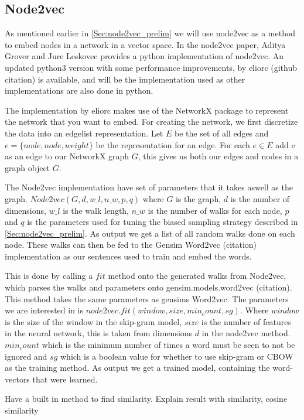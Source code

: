 \subsection{Node2vec}

As mentioned earlier in \ref{Sec:node2vec_prelim} we will use node2vec as a method to embed nodes in a network in a vector space. In the node2vec paper, Aditya Grover and Jure Leskovec provides a python implementation of node2vec. An updated python3 version with some performance improvements, by eliorc (github citation) is available, and will be the implementation used as other implementations are also done in python.

The implementation by eliorc makes use of the NetworkX package to represent the network that you want to embed. For creating the network, we first discretize the data into an edgelist representation. Let $E$ be the set of all edges and $e = \{node, node, weight\}$ be the representation for an edge. For each $e \in E$ add e as an edge to our NetworkX graph $G$, this gives us both our edges and nodes in a graph object $G$.

The Node2vec implementation have set of parameters that it takes aswell as the graph. $Node2vec(G, d, w\_l, n\_w, p, q)$ where $G$ is the graph, $d$ is the number of dimensions, $w\_l$ is the walk length, $n\_w$ is the number of walks for each node, $p$ and $q$ is the parameters used for tuning the biased sampling strategy described in \ref{Sec:node2vec_prelim}. As output we get a list of all random walks done on each node. These walks can then be fed to the Gensim Word2vec (citation) implementation as our sentences used to train and embed the words.

This is done by calling a $fit$ method onto the generated walks from Node2vec, which parses the walks and parameters onto gensim.models.word2vec (citation). This method takes the same parameters as gensims Word2vec. The parameters we are interested in is $node2vec.fit(window, size, min_count, sg)$. Where $window$ is the size of the window in the skip-gram model, $size$ is the number of features in the neural network, this is taken from dimensions $d$ in the node2vec method. $min_count$ which is the minimum number of times a word must be seen to not be ignored and $sg$ which is a boolean value for whether to use skip-gram or CBOW as the training method. As output we get a trained model, containing the word-vectors that were learned.

Have a built in method to find similarity.
Explain result with similarity, cosine similarity